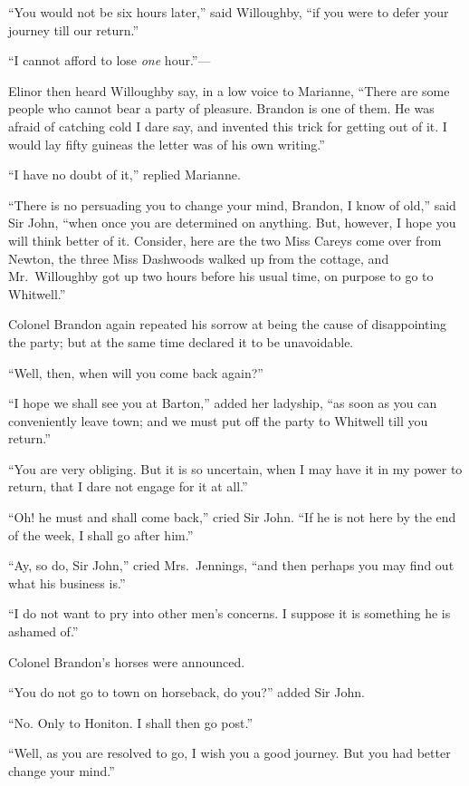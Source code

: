 \documentclass{article}
\begin{document}
``You would not be six hours later,'' said Willoughby,
``if you were to defer your journey till our return.''

``I cannot afford to lose \emph{one} hour.''---%

Elinor then heard Willoughby say, in a low voice to Marianne,
``There are some people who cannot bear a party of pleasure.
Brandon is one of them.  He was afraid of catching cold
I dare say, and invented this trick for getting out of it.
I would lay fifty guineas the letter was of his own writing.''

``I have no doubt of it,'' replied Marianne.

``There is no persuading you to change your mind,
Brandon, I know of old,'' said Sir John, ``when once you
are determined on anything.  But, however, I hope you
will think better of it.  Consider, here are the two Miss
Careys come over from Newton, the three Miss Dashwoods
walked up from the cottage, and Mr.\ Willoughby got up
two hours before his usual time, on purpose to go to Whitwell.''

Colonel Brandon again repeated his sorrow at being
the cause of disappointing the party; but at the same
time declared it to be unavoidable.

``Well, then, when will you come back again?''

``I hope we shall see you at Barton,'' added her ladyship,
``as soon as you can conveniently leave town; and we must
put off the party to Whitwell till you return.''

``You are very obliging.  But it is so uncertain,
when I may have it in my power to return, that I dare
not engage for it at all.''

``Oh! he must and shall come back,'' cried Sir John.
``If he is not here by the end of the week, I shall go
after him.''

``Ay, so do, Sir John,'' cried Mrs.\ Jennings, ``and then
perhaps you may find out what his business is.''

``I do not want to pry into other men's concerns.
I suppose it is something he is ashamed of.''

Colonel Brandon's horses were announced.

``You do not go to town on horseback, do you?''
added Sir John.

``No. Only to Honiton.  I shall then go post.''

``Well, as you are resolved to go, I wish you
a good journey.  But you had better change your mind.''
\end{document}
